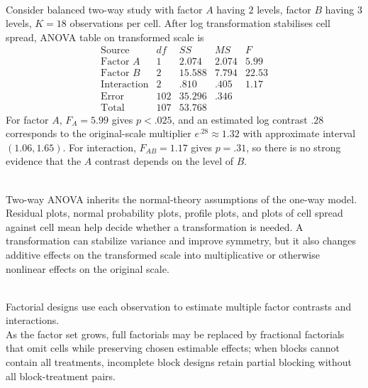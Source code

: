 \begin{example} \label{ex:generic-two-way-transformed-anova} \\
Consider balanced two-way study with factor $A$ having $2$ levels, factor $B$ having $3$ levels, $K=18$ observations per cell. After log transformation stabilises cell spread, ANOVA table on transformed scale is
\[
\begin{array}{c|rrrr}
\text{Source} & df & SS & MS & F\\ \hline
\text{Factor }A & 1 & 2.074 & 2.074 & 5.99\\
\text{Factor }B & 2 & 15.588 & 7.794 & 22.53\\
\text{Interaction} & 2 & .810 & .405 & 1.17\\
\text{Error} & 102 & 35.296 & .346 & \\
\text{Total} & 107 & 53.768 & &
\end{array}
\]
For factor $A$, $F_A=5.99$ gives $p<.025$, and an estimated log contrast $.28$ corresponds to the original-scale multiplier $e^{.28}\approx1.32$ with approximate interval $(1.06,1.65)$. For interaction, $F_{AB}=1.17$ gives $p=.31$, so there is no strong evidence that the $A$ contrast depends on the level of $B$.
\end{example}

\begin{remark} \label{rem:two-way-transformations-diagnostics} \\
Two-way ANOVA inherits the normal-theory assumptions of the one-way model.  Residual plots, normal probability plots, profile plots, and plots of cell spread against cell mean help decide whether a transformation is needed.  A transformation can stabilize variance and improve symmetry, but it also changes additive effects on the transformed scale into multiplicative or otherwise nonlinear effects on the original scale.
\end{remark}

\begin{remark} \label{rem:factorial-fractional-and-incomplete-designs} \\
Factorial designs use each observation to estimate multiple factor contrasts and interactions.\\
As the factor set grows, full factorials may be replaced by fractional factorials that omit cells while preserving chosen estimable effects; when blocks cannot contain all treatments, incomplete block designs retain partial blocking without all block-treatment pairs.
\end{remark}
